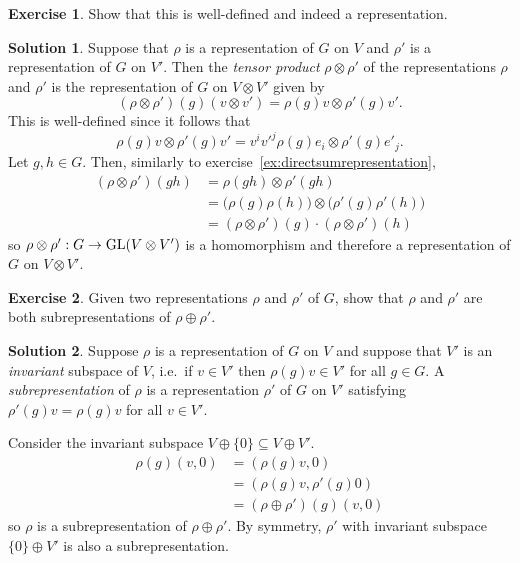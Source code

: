 \documentclass[11pt, a4paper]{report}
\theoremstyle{definition}
\newtheorem{exercise}{Exercise}[part]
\newtheorem{solution}{Solution}[part]
\newenvironment{ex}{\begin{exercise}}{\end{exercise}\pagebreak[1]}
\newenvironment{sol}{\begin{solution}}{\end{solution}\pagebreak[3]}
\newcommand*{\GL}{\ensuremath\text{GL}}
\begin{document}
\begin{ex}

Show that this is well-defined and indeed a representation.

\end{ex}

\begin{sol}

Suppose that $\rho$ is a representation of $G$ on $V$ and $\rho'$ is a representation of $G$ on $V'$.
Then the \emph{tensor product} $\rho \otimes \rho'$ of the representations $\rho$ and $\rho'$ is the representation of $G$ on $V \otimes V'$ given by
\[
    (\rho \otimes \rho')(g)(v \otimes v') = \rho(g) v \otimes \rho'(g) v'.
\]
This is well-defined since it follows that
\[
    \rho(g)v \otimes \rho'(g)v' = v^i v'^j \rho(g)e_i \otimes \rho'(g)e'_j.
\]
Let $g, h \in G$. Then, similarly to exercise~\ref{ex:directsumrepresentation},
\begin{align*}
    (\rho \otimes \rho')(gh) &= \rho(gh) \otimes \rho'(gh) \\
        &= \bigl( \rho(g) \rho(h) \bigr) \otimes \bigl( \rho'(g) \rho'(h) \bigr) \\
        &= (\rho \otimes \rho')(g) \cdot (\rho \otimes \rho')(h)
\end{align*}
so $\rho \otimes \rho': G \to \GL(V \otimes V')$ is a homomorphism and therefore a representation of $G$ on $V \otimes V'$.

\end{sol}

\begin{ex}

Given two representations $\rho$ and $\rho'$ of $G$, show that $\rho$ and $\rho'$ are both subrepresentations of $\rho \oplus \rho'$.

\end{ex}

\begin{sol}

Suppose $\rho$ is a representation of $G$ on $V$ and suppose that $V'$ is an \emph{invariant} subspace of $V$, i.e.\ if $v \in V'$ then $\rho(g)v \in V'$ for all $g \in G$.
A \emph{subrepresentation} of $\rho$ is a representation $\rho'$ of $G$ on $V'$ satisfying $\rho'(g)v = \rho(g)v$ for all $v \in V'$.

Consider the invariant subspace $V \oplus \{0\} \subseteq V \oplus V'$.
\begin{align*}
    \rho(g) (v, 0) &= \left( \rho(g)v, 0 \right) \\
                   &= \left( \rho(g)v, \rho'(g) 0 \right) \\
                   &= (\rho \oplus \rho')(g) (v, 0)
\end{align*}
so $\rho$ is a subrepresentation of $\rho \oplus \rho'$.
By symmetry, $\rho'$ with invariant subspace $\{0\} \oplus V'$ is also a subrepresentation.

\end{sol}
\end{document}
